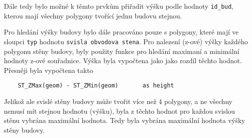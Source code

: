 Dále tedy bylo možné k těmto prvkům přiřadit výšku podle hodnoty {\tt id\_bud},
kterou mají všechny polygony tvořící jednu budovu stejnou.

Pro hledání výšky budovy bylo dále pracováno pouze s polygony,
které mají ve sloupci {\tt typ} hodnotu {\tt svisla obvodova stena}.
Pro nalezení (z-ové) výšky každého polygonu stěny budovy,
byly použity funkce pro hledání maximaní a minimální hodnoty z-ové souřadnice.
Výška byla vypočtena jako jako rozdíl těchto hodnot.
Přesněji byla vypočtena takto
\begin{verbatim}
    ST_ZMax(geom) - ST_ZMin(geom)       as height
\end{verbatim}

Jelikož ale svislé stěny budovy může tvořit více než 4 polygony,
a ne všechny nemusí mít stejnou hodnotu (výšku), byla z těchto hodnot
pro každou svislou stěnu vybrána maximální hodnota.
Tedy byla vybrána maximální hodnota výšky stěny budovy.
